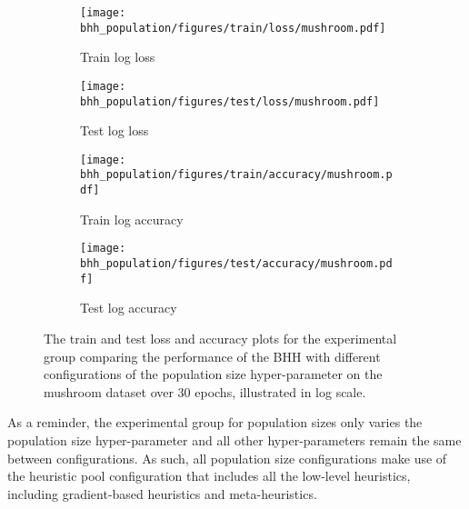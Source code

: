 \begin{figure}[htbp]
      \begin{subfigure}{0.5\textwidth}
            \centering
            \texttt{[image: bhh\_population/figures/train/loss/mushroom.pdf]}
            \caption{Train log loss}
            \label{fig:results:population:figures:loss:train:mushroom}
      \end{subfigure}
      \begin{subfigure}{0.5\textwidth}
            \centering
            \texttt{[image: bhh\_population/figures/test/loss/mushroom.pdf]}
            \caption{Test log loss}
            \label{fig:results:population:figures:loss:test:mushroom}
      \end{subfigure}
      \par\bigskip
      \begin{subfigure}{0.5\textwidth}
            \centering
            \texttt{[image: bhh\_population/figures/train/accuracy/mushroom.pdf]}
            \caption{Train log accuracy}
            \label{fig:results:population:figures:accuracy:train:mushroom}
      \end{subfigure}
      \begin{subfigure}{0.5\textwidth}
            \centering
            \texttt{[image: bhh\_population/figures/test/accuracy/mushroom.pdf]}
            \caption{Test log accuracy}
            \label{fig:results:population:figures:accuracy:test:mushroom}
      \end{subfigure}
      \par\bigskip
      \caption{The train and test loss and accuracy plots for the experimental group comparing the performance of the \acs{BHH} with different configurations of the population size hyper-parameter on the mushroom dataset over 30 epochs, illustrated in log scale.}
      \label{fig:results:population:figures:mushroom}
\end{figure}

As a reminder, the experimental group for population sizes only varies the population size hyper-parameter and all other hyper-parameters remain the same between configurations. As such, all population size configurations make use of the heuristic pool configuration that includes all the low-level heuristics, including gradient-based heuristics and meta-heuristics.

